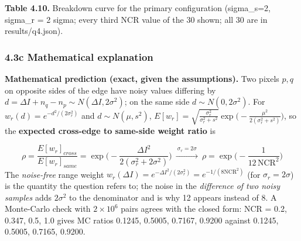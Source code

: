\documentclass[10pt,a4paper]{article}
\begin{document}
\begin{table}[H]\centering\small{\small\textbf{Table 4.10.} Breakdown curve for the primary configuration (sigma\_s=2, sigma\_r = 2 sigma; every third NCR value of the 30 shown; all 30 are in results/q4.json).\par}\vskip 3pt
\end{table}
\subsubsection{4.3c Mathematical explanation}
\textbf{Mathematical prediction (exact, given the assumptions).} Two pixels $p,q$ on opposite sides of the edge have noisy values differing by $d=\Delta I+n_q-n_p\sim N(\Delta I,2\sigma^2)$; on the same side $d\sim N(0,2\sigma^2)$. For $w_r(d)=e^{-d^2/(2\sigma_r^2)}$ and $d\sim N(\mu,s^2)$, $E[w_r]=\sqrt{\frac{\sigma_r^2}{\sigma_r^2+s^2}}\exp\!\big(-\frac{\mu^2}{2(\sigma_r^2+s^2)}\big)$, so the \textbf{expected cross-edge to same-side weight ratio} is

\begin{equation}\rho=\frac{E[w_r]_{cross}}{E[w_r]_{same}}=\exp\!\Big(-\frac{\Delta I^{2}}{2(\sigma_r^{2}+2\sigma^{2})}\Big)\ \xrightarrow{\ \sigma_r=2\sigma\ }\ \rho=\exp\!\Big(-\frac{1}{12\,\mathrm{NCR}^{2}}\Big)\end{equation}
The \textit{noise-free} range weight $w_r(\Delta I)=e^{-\Delta I^2/(2\sigma_r^2)}=e^{-1/(8\mathrm{NCR}^2)}$ (for $\sigma_r=2\sigma$) is the quantity the question refers to; the noise in the \textit{difference of two noisy samples} adds $2\sigma^2$ to the denominator and is why 12 appears instead of 8. A Monte-Carlo check with $2\times10^6$ pairs agrees with the closed form: NCR = 0.2, 0.347, 0.5, 1.0 gives MC ratios 0.1245, 0.5005, 0.7167, 0.9200 against 0.1245, 0.5005, 0.7165, 0.9200.
\end{document}

